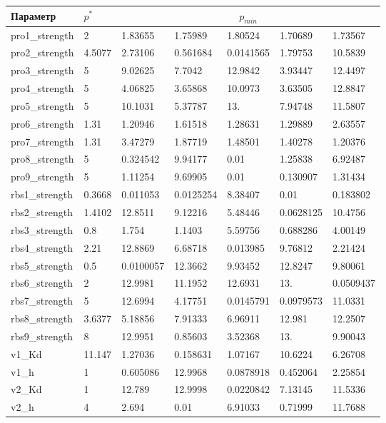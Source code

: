 \begin{tabular}{l|l|lllll}
Параметр & $p^*$ & \multicolumn{5}{c}{$p_{min}$} \\ 
\hline
pro1\_strength & 2 & 1.83655 & 1.75989 & 1.80524 & 1.70689 & 1.73567 \\ 
pro2\_strength & 4.5077 & 2.73106 & 0.561684 & 0.0141565 & 1.79753 & 10.5839 \\ 
pro3\_strength & 5 & 9.02625 & 7.7042 & 12.9842 & 3.93447 & 12.4497 \\ 
pro4\_strength & 5 & 4.06825 & 3.65868 & 10.0973 & 3.63505 & 12.8847 \\ 
pro5\_strength & 5 & 10.1031 & 5.37787 & 13. & 7.94748 & 11.5807 \\ 
pro6\_strength & 1.31 & 1.20946 & 1.61518 & 1.28631 & 1.29889 & 2.63557 \\ 
pro7\_strength & 1.31 & 3.47279 & 1.87719 & 1.48501 & 1.40278 & 1.20376 \\ 
pro8\_strength & 5 & 0.324542 & 9.94177 & 0.01 & 1.25838 & 6.92487 \\ 
pro9\_strength & 5 & 1.11254 & 9.69905 & 0.01 & 0.130907 & 1.31434 \\ 
rbs1\_strength & 0.3668 & 0.011053 & 0.0125254 & 8.38407 & 0.01 & 0.183802 \\ 
rbs2\_strength & 1.4102 & 12.8511 & 9.12216 & 5.48446 & 0.0628125 & 10.4756 \\ 
rbs3\_strength & 0.8 & 1.754 & 1.1403 & 5.59756 & 0.688286 & 4.00149 \\ 
rbs4\_strength & 2.21 & 12.8869 & 6.68718 & 0.013985 & 9.76812 & 2.21424 \\ 
rbs5\_strength & 0.5 & 0.0100057 & 12.3662 & 9.93452 & 12.8247 & 9.80061 \\ 
rbs6\_strength & 2 & 12.9981 & 11.1952 & 12.6931 & 13. & 0.0509437 \\ 
rbs7\_strength & 5 & 12.6994 & 4.17751 & 0.0145791 & 0.0979573 & 11.0331 \\ 
rbs8\_strength & 3.6377 & 5.18856 & 7.91333 & 6.96911 & 12.981 & 12.2507 \\ 
rbs9\_strength & 8 & 12.9951 & 0.85603 & 3.52368 & 13. & 9.90043 \\ 
v1\_Kd & 11.147 & 1.27036 & 0.158631 & 1.07167 & 10.6224 & 6.26708 \\ 
v1\_h & 1 & 0.605086 & 12.9968 & 0.0878918 & 0.452064 & 2.25854 \\ 
v2\_Kd & 1 & 12.789 & 12.9998 & 0.0220842 & 7.13145 & 11.5336 \\ 
v2\_h & 4 & 2.694 & 0.01 & 6.91033 & 0.71999 & 11.7688 \\ 

\end{tabular}
